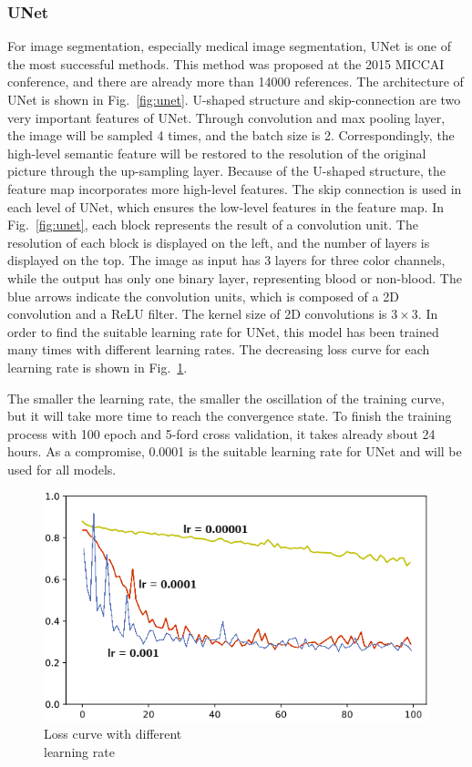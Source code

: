 \documentclass[10pt,journal,compsoc]{IEEEtran}
\begin{document}
\subsubsection{UNet}
For image segmentation, especially medical image \linebreak segmentation, UNet\cite{ronnebergerUNet} is one of the most successful methods. 
This method was proposed at the 2015 MICCAI conference, and there are already more than 14000 references.
The architecture of UNet is shown in Fig.~\ref{fig:unet}.
U-shaped structure and skip-connection are two very important features of UNet.
Through convolution and max pooling layer, the image will be sampled 4 times, and the batch size is 2.
Correspondingly, the high-level semantic feature will be restored to the resolution of the original picture through the up-sampling layer.
Because of the U-shaped structure, the feature map incorporates more high-level features.
The skip connection is used in each level of UNet, which ensures the low-level features in the feature map.
In Fig.~\ref{fig:unet}, each block represents the result of a convolution unit. 
The resolution of each block is displayed on the left, and the number of layers is displayed on the top.
The image as input has 3 layers for three color channels, while the output has only one binary layer, representing blood or non-blood.
The blue arrows indicate the convolution units, which is composed of a 2D convolution and a ReLU filter.
The kernel size of 2D convolutions is {$3 \times 3$}.
In order to find the suitable learning rate for UNet, this model has been trained many times with different learning rates. 
The decreasing loss curve for each learning rate is shown in Fig.~\ref{fig:unetLearningRate}.
\par
The smaller the learning rate, the smaller the oscillation of the training curve, but it will take more time to reach the convergence state.
To finish the training process with 100 epoch and 5-ford cross validation, it takes already sbout 24 hours.
As a compromise, 0.0001 is the suitable learning rate for UNet and will be used for all models.

\begin{figure}[h]
  \centering
  \includegraphics[width=\linewidth]{img/learning_rate.png}
  \caption{Loss curve with different \\ learning rate}
  \label{fig:unetLearningRate}
\end{figure}
\end{document}
